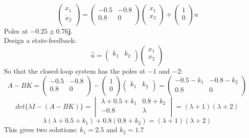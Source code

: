 \begin{ex}{}
\begin{equation*}
\begin{pmatrix}
\dot{x}_{1}\\
\dot{x}_{2}\\
\end{pmatrix} = 
\begin{pmatrix}
-0.5&-0.8\\
0.8&0\\
\end{pmatrix}
\begin{pmatrix}
x_{1}\\
x_{2}\\
\end{pmatrix}
+\begin{pmatrix}
1\\
0\\
\end{pmatrix}
u
\end{equation*}
Poles at $-0.25\pm 0.76\mathbf{j}$.\ \\
Design a state-feedback:
\begin{equation*}
\hat{u} = \begin{pmatrix}
k_{1} & k_{2}\\
\end{pmatrix}
\begin{pmatrix}
x_{1}\\
x_{2}\\
\end{pmatrix}
\end{equation*}
So that the closed-loop system has the poles at $-1$ and $-2$:
\begin{equation*}
A-BK = \begin{pmatrix}
-0.5&-0.8\\
0.8&0\\
\end{pmatrix}-
\begin{pmatrix}
1\\
0\\
\end{pmatrix}
\begin{pmatrix} 
k_{1}&k_{2}\\
\end{pmatrix}
 = 
 \begin{pmatrix}
 -0.5-k_{1}&-0.8-k_{2}\\
 0.8&0\\
 \end{pmatrix}
\end{equation*}
\begin{equation*}
det\{\lambda I-(A-BK)\} = \begin{vmatrix}
\lambda+0.5+k_{1} & 0.8+k_{2}\\
-0.8&\lambda\\
\end{vmatrix}
= (\lambda +1)(\lambda +2) 
\end{equation*}
\[ \lambda(\lambda + 0.5 + k_{1}) + 0.8(0.8 + k_{2}) = (\lambda +1)(\lambda +2) \]
This gives two solutions: $k_{1}=2.5$ and $k_{2}=1.7$
\end{ex}


